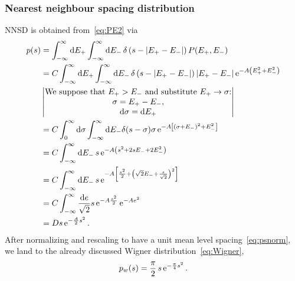 \documentclass[a4paper,11pt,twoside]{article}
\begin{document}
        \subsubsection{Nearest neighbour spacing distribution}
            NNSD is obtained from~\eqref{eq:PE2} via
            \begin{align}
                p(s)&=\int_{-\infty}^{\infty}\mathrm{d} E_{+}\int_{-\infty}^{\infty}\mathrm{d} E_{-}\,\delta\left(s-\left|{E_{+}-E_{-}}\right|\right)P(E_{+},E_{-})\nonumber\\
                    &=C\int_{-\infty}^{\infty}\mathrm{d} E_{+}\int_{-\infty}^{\infty}\mathrm{d} E_{-}\,\delta\left(s-\left|{E_{+}-E_{-}}\right|\right)\left|{E_{+}-E_{-}}\right|\operatorname{e}^{-A\left(E_{+}^{2}+E_{-}^{2}\right)}\nonumber\\
                    &\begin{vmatrix}\text{We suppose that $E_{+}>E_{-}$ and substitute $E_{+}\rightarrow\sigma$:} \\
                        \sigma=E_{+}-E_{-},\\
                        \mathrm{d}\sigma=\mathrm{d} E_{+}\end{vmatrix}\nonumber\\
                    &=C\int_{0}^{\infty}\mathrm{d}\sigma\int_{-\infty}^{\infty}\mathrm{d} E_{-}\delta(s-\sigma)\sigma\operatorname{e}^{-A\left[\left(\sigma+E_{-}\right)^{2}+E_{-}^{2}\right]}\nonumber\\
                    &=C\int_{-\infty}^{\infty}\mathrm{d} E_{-}\,s\operatorname{e}^{-A\left(s^{2}+2sE_{-}+2E_{-}^{2}\right)}\nonumber\\
                    &=C\int_{-\infty}^{\infty}\mathrm{d} E_{-}\,s\operatorname{e}^{-A\left[\frac{s^{2}}{2}+\left(\sqrt{2}E_{-}+\frac{s}{\sqrt{2}}\right)^{2}\right]}\nonumber\\
                    &=C\int_{-\infty}^{\infty}\frac{\mathrm{d} e}{\sqrt{2}}s\operatorname{e}^{-A\frac{s^{2}}{2}}\operatorname{e}^{-A e^{2}}\nonumber\\
                    &=Ds\operatorname{e}^{-\frac{A}{2}s^{2}}.
            \end{align} 
            After normalizing and rescaling to have a unit mean level spacing~\eqref{eq:psnorm}, we land to the already discussed Wigner distribution~\eqref{eq:Wigner},
            \begin{equation}\label{eq:Wigner1}
                p_{w}(s)=\frac{\pi}{2}\,s\operatorname{e}^{-\frac{\pi}{4}s^{2}}.
            \end{equation}
\end{document}
